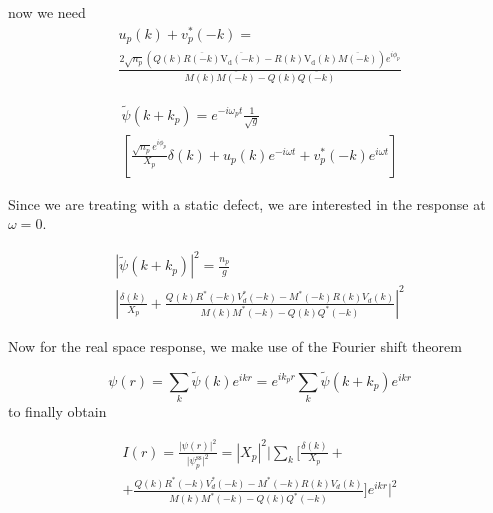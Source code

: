 \documentclass[a4paper,prb,10pt,aps,twocolumn]{revtex4-1}
\begin{document}
now we need 
\begin{multline}
  \label{eq:138}
u_p(k)+v_p^*(-k)=\\\frac{2 \sqrt{n_{p}} \left(Q{\left (k \right )} \overline{R{\left (- k \right )}} \overline{\operatorname{V_{d}}{\left (- k \right )}} - R{\left (k \right )} \operatorname{V_{d}}{\left (k \right )} \overline{M{\left (- k \right )}}\right) e^{i \phi_{p}}}{M{\left (k \right )} \overline{M{\left (- k \right )}} - Q{\left (k \right )} \overline{Q{\left (- k \right )}}}
\end{multline}

\begin{multline}
  \label{eq:139}
\widetilde{\psi}(k+k_{p})=e^{-i\omega_{p}t}\frac{1}{\sqrt{g}}\\
\left[\frac{\sqrt{n_{p}}e^{i\phi_{p}}}{X_{p}}\delta(k)+u_{p}(k)e^{-i\omega t}+v_{p}^{*}(-k)e^{i\omega t}\right]  
\end{multline}

Since we are treating with a static defect, we are interested in the
response at $\omega = 0$.

\begin{multline}
  \label{eq:140}
\left|\widetilde{\psi}\left(k+k_{p}\right)\right|^{2}=\frac{n_{p}}{g}\\
\left|\frac{\delta(k)}{X_{p}}+\frac{Q\left(k\right)R^{*}\left(-k\right)V_{d}^{*}\left(-k\right)-M^{*}\left(-k\right)R\left(k\right)V_{d}\left(k\right)}{M\left(k\right)M^{*}\left(-k\right)-Q\left(k\right)Q^{*}\left(-k\right)}\right|^{2}
\end{multline}

Now for the real space response, we make use of the Fourier shift
theorem

\begin{equation}
  \label{eq:141}
\psi(r)=\sum_{k}\widetilde{\psi}(k)e^{ikr}=e^{ik_{p}r}\sum_{k}\widetilde{\psi}(k+k_{p})e^{ikr}
\end{equation}
to finally obtain

\begin{multline}
  \label{eq:142}
I(r)=\frac{\vert\psi(r)\vert^{2}}{\vert\psi_p^{\text{ss}}\vert^{2}}=\left|X_{p}\right|^{2}\Bigg|\sum_{k}\Bigg[\frac{\delta(k)}{X_{p}}+\\
+\frac{Q\left(k\right)R^{*}\left(-k\right)V_{d}^{*}\left(-k\right)-M^{*}\left(-k\right)R\left(k\right)V_{d}\left(k\right)}{M\left(k\right)M^{*}\left(-k\right)-Q\left(k\right)Q^{*}\left(-k\right)}\Bigg]e^{ikr}\Bigg|^{2}  
\end{multline}
\end{document}
